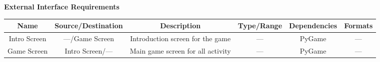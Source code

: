\documentclass[twoside,letterpaper]{article}
\begin{document}

\begin{minipage}{\linewidth}
\centering
\textbf{External Interface Requirements}
\end{minipage}

\begin{minipage}{\linewidth}
\centering
{}
\begin{tabular}{c c c c c c } \toprule[1.5pt]
\bf Name & \bf Source/Destination & \bf Description & \bf Type/Range & \bf Dependencies & \bf Formats\\ \toprule[1.0pt]
Intro Screen & ---/Game Screen & Introduction screen for the game & --- & PyGame & --- \\
Game Screen & Intro Screen/--- & Main game screen for all activity & --- & PyGame & --- \\
\bottomrule[1.5pt]
\end {tabular} %
\end{minipage}
\end{document}
